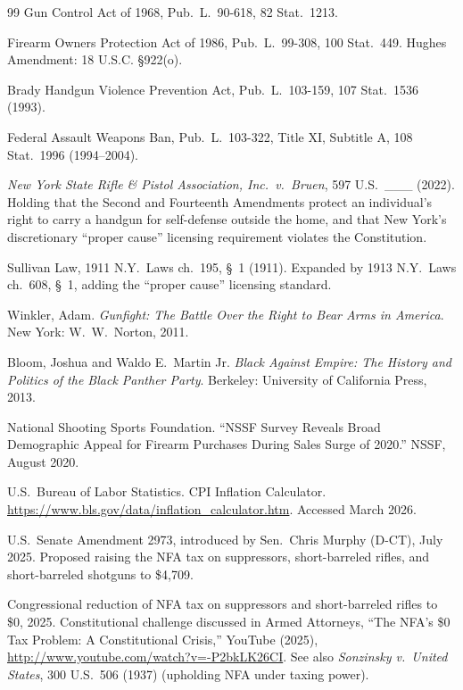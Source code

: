 \documentclass[12pt,openany]{book}
\begin{document}
\begin{thebibliography}{99}
Gun Control Act of 1968, Pub.~L.~90-618, 82 Stat.~1213.

Firearm Owners Protection Act of 1986, Pub.~L.~99-308, 100 Stat.~449. Hughes Amendment: 18 U.S.C. \S922(o).

Brady Handgun Violence Prevention Act, Pub.~L.~103-159, 107 Stat.~1536 (1993).

Federal Assault Weapons Ban, Pub.~L.~103-322, Title XI, Subtitle A, 108 Stat.~1996 (1994--2004).

\textit{New York State Rifle \& Pistol Association, Inc.\ v.\ Bruen}, 597 U.S.\ \_\_\_ (2022). Holding that the Second and Fourteenth Amendments protect an individual's right to carry a handgun for self-defense outside the home, and that New York's discretionary ``proper cause'' licensing requirement violates the Constitution.

Sullivan Law, 1911 N.Y.~Laws ch.~195, \S~1 (1911). Expanded by 1913 N.Y.~Laws ch.~608, \S~1, adding the ``proper cause'' licensing standard.

Winkler, Adam. \textit{Gunfight: The Battle Over the Right to Bear Arms in America}. New York: W.~W.~Norton, 2011.

Bloom, Joshua and Waldo E.~Martin Jr. \textit{Black Against Empire: The History and Politics of the Black Panther Party}. Berkeley: University of California Press, 2013.

National Shooting Sports Foundation. ``NSSF Survey Reveals Broad Demographic Appeal for Firearm Purchases During Sales Surge of 2020.'' NSSF, August 2020.

U.S.~Bureau of Labor Statistics. CPI Inflation Calculator. \url{https://www.bls.gov/data/inflation_calculator.htm}. Accessed March 2026.

U.S.~Senate Amendment 2973, introduced by Sen.~Chris Murphy (D-CT), July 2025. Proposed raising the NFA tax on suppressors, short-barreled rifles, and short-barreled shotguns to \$4,709.

Congressional reduction of NFA tax on suppressors and short-barreled rifles to \$0, 2025. Constitutional challenge discussed in Armed Attorneys, ``The NFA's \$0 Tax Problem: A Constitutional Crisis,'' YouTube (2025), \url{http://www.youtube.com/watch?v=-P2bkLK26CI}. See also \textit{Sonzinsky v.\ United States}, 300 U.S.~506 (1937) (upholding NFA under taxing power).


\end{thebibliography}
\end{document}
